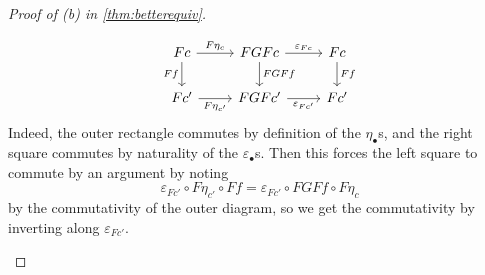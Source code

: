 \begin{proof}[Proof of (b) in \autoref{thm:betterequiv}]
\begin{itemize}
		\[\begin{tikzcd}
			Fc & FGFc & Fc \\
			{Fc'} & {FGFc'} & {Fc'}
			\arrow["{F\eta_c}", from=1-1, to=1-2]
			\arrow["Ff"', from=1-1, to=2-1]
			\arrow["{F\eta_{c'}}"', from=2-1, to=2-2]
			\arrow["FGFf", from=1-2, to=2-2]
			\arrow["Ff", from=1-3, to=2-3]
			\arrow["{\varepsilon_{Fc}}", from=1-2, to=1-3]
			\arrow["{\varepsilon_{Fc'}}"', from=2-2, to=2-3]
		\end{tikzcd}\]
		Indeed, the outer rectangle commutes by definition of the $\eta_\bullet$s, and the right square commutes by naturality of the $\varepsilon_\bullet$s. Then this forces the left square to commute by an argument by noting
		\[\varepsilon_{Fc'}\circ F\eta_{c'}\circ Ff=\varepsilon_{Fc'}\circ FGFf\circ F\eta_c\]
		by the commutativity of the outer diagram, so we get the commutativity by inverting along $\varepsilon_{Fc'}$.
		\qedhere
	\end{itemize}
\end{proof}